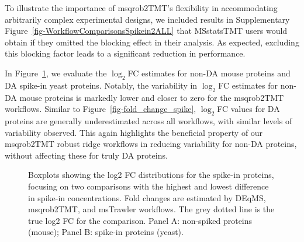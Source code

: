 \documentclass[
  letterpaper,
  DIV=11,
  numbers=noendperiod]{scrartcl}
\begin{document}
To illustrate the importance of msqrob2TMT's flexibility in
accommodating arbitrarily complex experimental designs, we included
results in Supplementary Figure~\ref{fig-WorkflowComparisonsSpikein2ALL}
that MSstatsTMT users would obtain if they omitted the blocking effect
in their analysis. As expected, excluding this blocking factor leads to
a significant reduction in performance.

In Figure~\ref{fig-fold_change_spike2}, we evaluate the \(\log_2\)FC
estimates for non-DA mouse proteins and DA spike-in yeast proteins.
Notably, the variability in \(\log_2\)FC estimates for non-DA mouse
proteins is markedly lower and closer to zero for the msqrob2TMT
workflows. Similar to Figure~\ref{fig-fold_change_spike}, \(\log_2\)FC
values for DA proteins are generally underestimated across all
workflows, with similar levels of variability observed. This again
highlights the beneficial property of our msqrob2TMT robust ridge
workflows in reducing variability for non-DA proteins, without affecting
these for truly DA proteins.

\begin{figure}[H]


\caption{\label{fig-fold_change_spike2}Boxplots showing the log2 FC
distributions for the spike-in proteins, focusing on two comparisons
with the highest and lowest difference in spike-in concentrations. Fold
changes are estimated by DEqMS, msqrob2TMT, and msTrawler workflows. The
grey dotted line is the true log2 FC for the comparison. Panel A:
non-spiked proteins (mouse); Panel B: spike-in proteins (yeast).}

\end{figure}%
\end{document}
